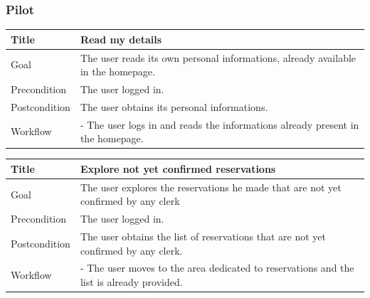 \documentclass{beamer}
\begin{document}
\begin{frame}
    \frametitle{Pilot}
    \begin{table}
        \tiny
        \begin{tabular}{|p{2cm}|p{6cm}|}
        \hline
        Title & \textbf{Read my details} \\
        \hline
        Goal & The user reads its own personal informations, already available in the homepage.\\
        \hline
        Precondition & The user logged in. \\
        \hline
        Postcondition & The user obtains its personal informations. \\
        \hline
        Workflow &
        - The user logs in and reads the informations already present in the homepage. \\
        \hline
        \end{tabular}
\end{table}

\begin{table}
    \tiny
    \begin{tabular}{|p{2cm}|p{6cm}|}
    \hline
    Title & \textbf{Explore not yet confirmed reservations} \\
    \hline
    Goal & The user explores the reservations he made that are not yet confirmed by any clerk \\
    \hline
    Precondition & The user logged in. \\
    \hline
    Postcondition & The user obtains the list of reservations that are not yet confirmed by any clerk. \\
    \hline
    Workflow &
    - The user moves to the area dedicated to reservations and the list is already provided. \\
    \hline
    \end{tabular}
\end{table}

\end{frame}
\end{document}
